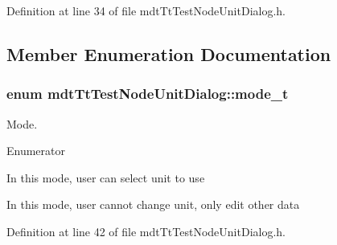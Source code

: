 Definition at line 34 of file mdt\-Tt\-Test\-Node\-Unit\-Dialog.\-h.



\subsection{Member Enumeration Documentation}
\hypertarget{classmdt_tt_test_node_unit_dialog_a27aec8b26b20230fcf0054e2f2f5c18e}{
\subsubsection[{mode\-\_\-t}]{\setlength{\rightskip}{0pt plus 5cm}enum {\bf mdt\-Tt\-Test\-Node\-Unit\-Dialog\-::mode\-\_\-t}}}\label{classmdt_tt_test_node_unit_dialog_a27aec8b26b20230fcf0054e2f2f5c18e}


Mode. 

\begin{Desc}
\item[Enumerator]\par
\begin{description}
\item[{\em 
\hypertarget{classmdt_tt_test_node_unit_dialog_a27aec8b26b20230fcf0054e2f2f5c18ea2cbe738c7f02392a4958df04614f09bf}{Add}\label{classmdt_tt_test_node_unit_dialog_a27aec8b26b20230fcf0054e2f2f5c18ea2cbe738c7f02392a4958df04614f09bf}
}]In this mode, user can select unit to use \item[{\em 
\hypertarget{classmdt_tt_test_node_unit_dialog_a27aec8b26b20230fcf0054e2f2f5c18ea24f18a30dc0ef344be1955ba4438d525}{Edit}\label{classmdt_tt_test_node_unit_dialog_a27aec8b26b20230fcf0054e2f2f5c18ea24f18a30dc0ef344be1955ba4438d525}
}]In this mode, user cannot change unit, only edit other data \end{description}
\end{Desc}


Definition at line 42 of file mdt\-Tt\-Test\-Node\-Unit\-Dialog.\-h.



